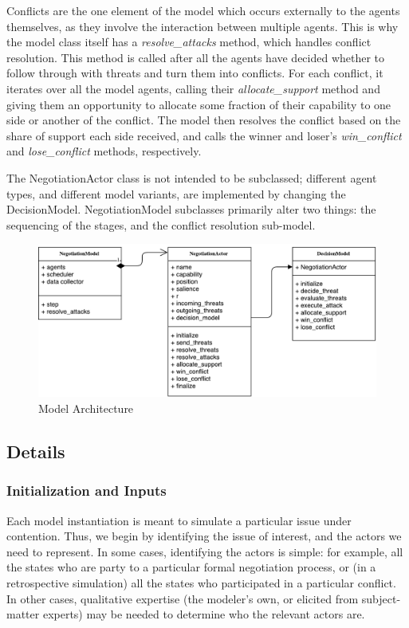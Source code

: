 Conflicts are the one element of the model which occurs externally to the agents themselves, as they involve the interaction between multiple agents. This is why the model class itself has a \emph{resolve\_attacks} method, which handles conflict resolution. This method is called after all the agents have decided whether to follow through with threats and turn them into conflicts. For each conflict, it iterates over all the model agents, calling their \emph{allocate\_support} method and giving them an opportunity to allocate some fraction of their capability to one side or another of the conflict. The model then resolves the conflict based on the share of support each side received, and calls the winner and loser's \emph{win\_conflict} and \emph{lose\_conflict} methods, respectively.

The NegotiationActor class is not intended to be subclassed; different agent types, and different model variants, are implemented by changing the DecisionModel. NegotiationModel subclasses primarily alter two things: the sequencing of the stages, and the conflict resolution sub-model.

\begin{figure}
  \centering
  \includegraphics[width=\textwidth]{BDM_Reproduction/Figures/BDM_Architecture}
  \caption{Model Architecture}
  \label{fig:bdm_architecture}
  \figSpace
\end{figure}

\subsection{Details} \label{details}
\subsubsection{Initialization and Inputs} \label{initialization}

Each model instantiation is meant to simulate a particular issue under contention. Thus, we begin by identifying the issue of interest, and the actors we need to represent. In some cases, identifying the actors is simple: for example, all the states who are party to a particular formal negotiation process, or (in a retrospective simulation) all the states who participated in a particular conflict. In other cases, qualitative expertise (the modeler's own, or elicited from subject-matter experts) may be needed to determine who the relevant actors are.

